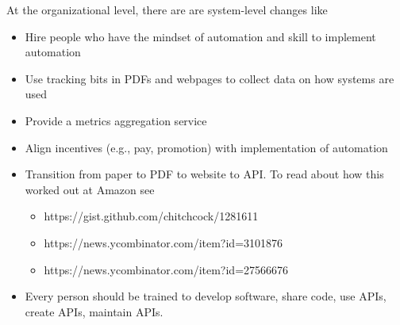 At the organizational level, there are are system-level changes like
\begin{itemize}
    \item Hire people who have the mindset of automation and skill to implement automation
    \item Use tracking bits in PDFs and webpages to collect data on how systems are used
    \item Provide a metrics aggregation service
    \item Align incentives (e.g., pay, promotion) with implementation of automation
    \item Transition from paper to PDF to website to API. To read about how this worked out at Amazon see \begin{itemize}
        \item https://gist.github.com/chitchcock/1281611
        \item https://news.ycombinator.com/item?id=3101876
        \item https://news.ycombinator.com/item?id=27566676
    \end{itemize}
    \item Every person should be trained to develop software, share code, use APIs, create APIs, maintain APIs.
\end{itemize}
